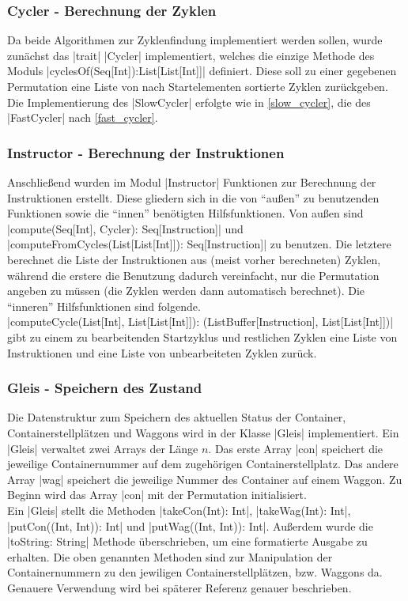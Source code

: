 \subsubsection{Cycler - Berechnung der Zyklen}
Da beide Algorithmen zur Zyklenfindung implementiert werden sollen, wurde zunächst das |trait| |Cycler| implementiert,
welches die einzige Methode des Moduls |cyclesOf(Seq[Int]):List[List[Int]]| definiert.
Diese soll zu einer gegebenen Permutation eine Liste von nach Startelementen sortierte Zyklen zurückgeben. \\
Die Implementierung des |SlowCycler| erfolgte wie in \ref{slow_cycler}, die des |FastCycler| nach \ref{fast_cycler}.

\subsubsection{Instructor - Berechnung der Instruktionen}
Anschließend wurden im Modul |Instructor| Funktionen zur Berechnung der Instruktionen erstellt.
Diese gliedern sich in die von ``außen'' zu benutzenden Funktionen sowie die ``innen'' benötigten Hilfsfunktionen.
Von außen sind |compute(Seq[Int], Cycler): Seq[Instruction]| und |computeFromCycles(List[List[Int]]): Seq[Instruction]| zu benutzen.
Die letztere berechnet die Liste der Instruktionen aus (meist vorher berechneten) Zyklen,
während die erstere die Benutzung dadurch vereinfacht, nur die Permutation angeben zu müssen (die Zyklen werden dann automatisch berechnet).
Die ``inneren'' Hilfsfunktionen sind folgende. \\
|computeCycle(List[Int], List[List[Int]]): (ListBuffer[Instruction], List[List[Int]])|
gibt zu einem zu bearbeitenden Startzyklus und restlichen Zyklen eine Liste von Instruktionen und eine Liste von unbearbeiteten Zyklen zurück.

\subsubsection{Gleis - Speichern des Zustand}
\label{gleis}
Die Datenstruktur zum Speichern des aktuellen Status der Container, Containerstellplätzen und Waggons wird in der Klasse |Gleis| implementiert.
Ein |Gleis| verwaltet zwei Arrays der Länge $n$. Das erste Array |con| speichert die jeweilige Containernummer auf dem zugehörigen Containerstellplatz.
Das andere Array |wag| speichert die jeweilige Nummer des Container auf einem Waggon.
Zu Beginn wird das Array |con| mit der Permutation initialisiert. \\
Ein |Gleis| stellt die Methoden |takeCon(Int): Int|, |takeWag(Int): Int|, |putCon((Int, Int)): Int| und |putWag((Int, Int)): Int|.
Außerdem wurde die |toString: String| Methode überschrieben, um eine formatierte Ausgabe zu erhalten.
Die oben genannten Methoden sind zur Manipulation der Containernummern zu den jewiligen Containerstellplätzen, bzw. Waggons da.
Genauere Verwendung wird bei späterer Referenz genauer beschrieben.


